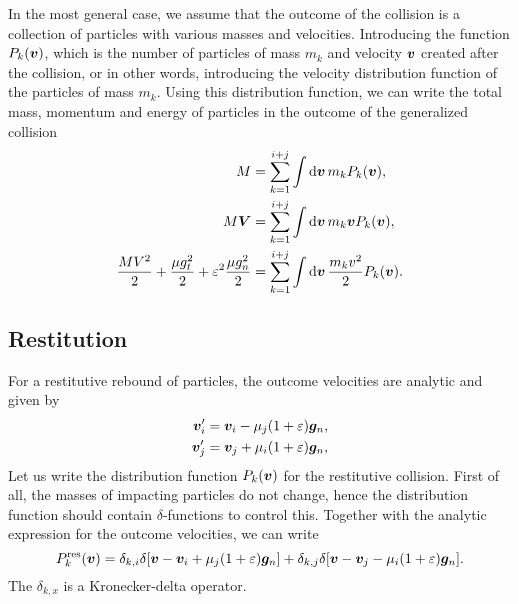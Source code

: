 \documentclass[aps,prl,preprint,groupedaddress,10pt]{revtex4-2}
\begin{document}
In the most general case, we assume that
the outcome of the collision is a collection of particles with various masses and 
velocities. Introducing the function $P_k\pqty{\bv}$, which is the number of 
particles of mass $m_k$ and velocity $\vb*{v}$ created after the collision, 
or in other words, introducing the velocity distribution function of the particles of 
mass $m_k$. Using this distribution function, we can write the total mass, momentum and 
energy of particles in the outcome of the generalized collision
\begin{equation}
    \begin{split}
        M &= \sum_{k=1}^{i+j}\int\dd{\bv}m_kP_k\pqty{\bv},\\
        M\bV &= \sum_{k=1}^{i+j}\int\dd{\bv}m_k\bv P_k\pqty{\bv},\\
        \frac{MV^2}{2}+\frac{\mu g_t^2}{2}+\eps^2\frac{\mu g_n^2}{2} &= 
        \sum_{k=1}^{i+j}\int\dd{\bv}\frac{m_kv^2}{2}P_k\pqty{\bv}.
    \end{split}
\end{equation}

\subsection{Restitution}
For a restitutive rebound of particles, the outcome velocities are analytic and given by
\begin{equation}
    \begin{split}
        \bv_i'&=\bv_i-\mu_j\pqty{1+\eps}\bg_n,\\
        \bv_j'&=\bv_j+\mu_i\pqty{1+\eps}\bg_n,
    \end{split}
\end{equation}
Let us write the distribution function $P_k\pqty{\bv}$ for the restitutive collision.
First of all, the masses of impacting particles do not change, hence the distribution
function should contain $\delta$-functions to control this. Together with the analytic 
expression for the outcome velocities, we can write
\begin{equation}
    \utx{P_k}{res}\pqty{\bv}=
    \delta_{k,i}\delta\bqty{\bv-\bv_i+\mu_j\pqty{1+\eps}\bg_n}+
    \delta_{k,j}\delta\bqty{\bv-\bv_j-\mu_i\pqty{1+\eps}\bg_n}.
\end{equation}
The $\delta_{k,x}$ is a Kronecker-delta operator.
\end{document}

